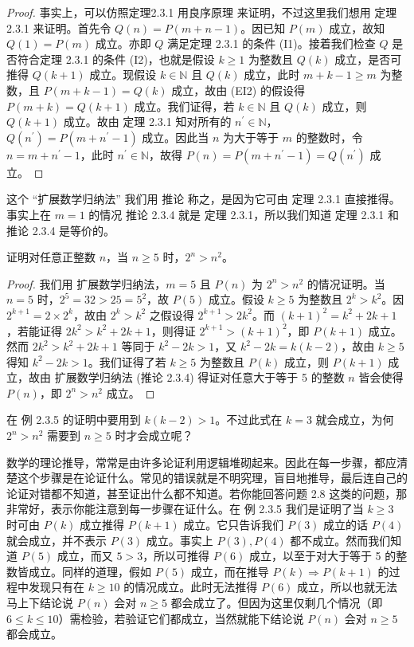 \begin{proof}
事实上，可以仿照定理2.3.1 用良序原理 来证明，不过这里我们想用 定理 2.3.1 来证明。首先令 $Q(n) = P(m + n - 1)$。因已知 $P(m)$ 成立，故知 $Q(1) = P(m)$ 成立。亦即 $Q$ 满足定理 2.3.1 的条件 (I1)。接着我们检查 $Q$ 是否符合定理 2.3.1 的条件 (I2)，也就是假设 $k \ge 1$ 为整数且 $Q(k)$ 成立，是否可推得 $Q(k+1)$ 成立。现假设 $k \in \mathbb{N}$ 且 $Q(k)$ 成立，此时 $m + k - 1 \ge m$ 为整数，且 $P(m + k - 1) = Q(k)$ 成立，故由 (EI2) 的假设得 $P(m + k) = Q(k + 1)$ 成立。我们证得，若 $k \in \mathbb{N}$ 且 $Q(k)$ 成立，则 $Q(k+1)$ 成立。故由 定理 2.3.1 知对所有的 $n^{\prime} \in \mathbb{N}$，$Q(n^{\prime}) = P(m + n^{\prime} - 1)$ 成立。因此当 $n$ 为大于等于 $m$ 的整数时，令 $n = m + n^{\prime} - 1$，此时 $n^{\prime} \in \mathbb{N}$，故得 $P(n) = P(m + n^{\prime} - 1) = Q(n^{\prime})$ 成立。
\end{proof}

这个 “扩展数学归纳法” 我们用 推论 称之，是因为它可由 定理 2.3.1 直接推得。事实上在 $m = 1$ 的情况 推论 2.3.4 就是 定理 2.3.1，所以我们知道 定理 2.3.1 和 推论 2.3.4 是等价的。

\begin{example}
证明对任意正整数 $n$，当 $n \ge 5$ 时，$2^n > n^2$。
\end{example}

\begin{proof}
我们用 扩展数学归纳法，$m = 5$ 且 $P(n)$ 为 $2^n > n^2$ 的情况证明。当 $n = 5$ 时，$2^5 = 32 > 25 = 5^2$，故 $P(5)$ 成立。假设 $k \ge 5$ 为整数且 $2^k > k^2$。因 $2^{k+1} = 2 \times 2^k$，故由 $2^k > k^2$ 之假设得 $2^{k+1} > 2k^2$。而 $(k+1)^2 = k^2 + 2k + 1$，若能证得 $2k^2 > k^2 + 2k + 1$，则得证 $2^{k+1} > (k+1)^2$，即 $P(k+1)$ 成立。然而 $2k^2 > k^2 + 2k + 1$ 等同于 $k^2 - 2k > 1$，又 $k^2 - 2k = k(k - 2)$，故由 $k \ge 5$ 得知 $k^2 - 2k > 1$。我们证得了若 $k \ge 5$ 为整数且 $P(k)$ 成立，则 $P(k+1)$ 成立，故由 扩展数学归纳法 (推论 2.3.4) 得证对任意大于等于 5 的整数 $n$ 皆会使得 $P(n)$，即 $2^n > n^2$ 成立。
\end{proof}

\begin{question}
在 例 2.3.5 的证明中要用到 $k(k - 2) > 1$。不过此式在 $k = 3$ 就会成立，为何 $2^n > n^2$ 需要到 $n \ge 5$ 时才会成立呢？
\end{question}

数学的理论推导，常常是由许多论证利用逻辑堆砌起来。因此在每一步骤，都应清楚这个步骤是在论证什么。常见的错误就是不明究理，盲目地推导，最后连自己的论证对错都不知道，甚至证出什么都不知道。若你能回答问题 2.8 这类的问题，那非常好，表示你能注意到每一步骤在证什么。在 例 2.3.5 我们是证明了当 $k \ge 3$ 时可由 $P(k)$ 成立推得 $P(k+1)$ 成立。它只告诉我们 $P(3)$ 成立的话 $P(4)$ 就会成立，并不表示 $P(3)$ 成立。事实上 $P(3), P(4)$ 都不成立。然而我们知道 $P(5)$ 成立，而又 $5 > 3$，所以可推得 $P(6)$ 成立，以至于对大于等于 5 的整数皆成立。同样的道理，假如 $P(5)$ 成立，而在推导 $P(k) \Rightarrow P(k+1)$ 的过程中发现只有在 $k \ge 10$ 的情况成立。此时无法推得 $P(6)$ 成立，所以也就无法马上下结论说 $P(n)$ 会对 $n \ge 5$ 都会成立了。但因为这里仅剩几个情况（即 $6 \le k \le 10$）需检验，若验证它们都成立，当然就能下结论说 $P(n)$ 会对 $n \ge 5$ 都会成立。

